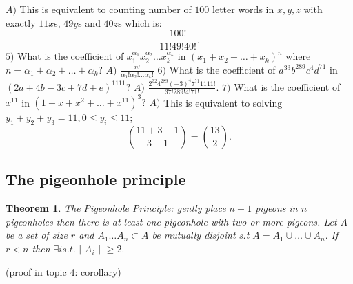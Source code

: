 \documentclass{article}
\newtheorem{theorem}{Theorem}                                       %
\begin{document}
\newline
\newline
$A) $ This is equivalent to counting number of $100$ letter words in $x, y, z$ with exactly $11 x$s, $49 y$s and $40 z$s which is: 
$$\frac{100!}{11!49!40!}.$$
$5) $ What is the coefficient of $x_1^{\alpha_1}x_2^{\alpha_2} \dots x_k^{\alpha_k}$ in $(x_1 + x_2 + \dots + x_k)^n$ where
$n = \alpha_1 + \alpha_2 + \dots + \alpha_k?$
\newline
$A) $ $\frac{n!}{\alpha_1!\alpha_2! \dots \alpha_k!}$
\newline
\newline
$6) $ What is the coefficient of $a^{33}b^{289}c^4d^{71}$ in $(2a + 4b - 3c + 7d + e)^{1111}?$
\newline
\newline
$A) $ $\frac{2^{32}4^{289}(-3)^{4}7^{71} 1111!}{37!289!4!71!}.$ 
\newline
$7) $ What is the coefficient of $x^{11}$ in $(1 + x + x^2 + \dots + x^{11})^3?$
\newline
\newline
$A) $ This is equivalent to solving $y_1 + y_2 + y_3 = 11, 0 \leq y_i \leq 11$; 
$$\binom{11 + 3 - 1}{3 - 1} = \binom{13}{2}.$$
\newpage
\subsection{The pigeonhole principle}
\begin{theorem}
  The Pigeonhole Principle: gently place $n + 1$ pigeons in $n$ pigeonholes 
  then there is at least one pigeonhole with two or more pigeons. 
  \newline
  \newline
  Let $A$ be a set of size $r$ and $A_1 \dots A_n \subset A$ be mutually
  disjoint s.t $A = A_1 \cup \dots \cup A_n.$ If $r < n$ then 
  $\exists i s.t. \text{ | } A_i \text{ | } \geq 2.$
\end{theorem}
(proof in topic 4: corollary)
\newpage
\end{document}
